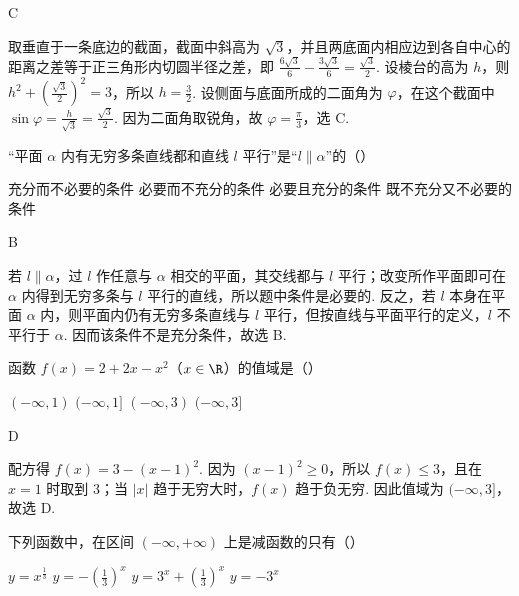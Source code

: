 \documentclass[UTF8,a4paper,oneside,11pt]{ctexbook}
\begin{document}
\begin{answer}
C
\end{answer}

\begin{solution}
取垂直于一条底边的截面，截面中斜高为 \(\sqrt3\)，并且两底面内相应边到各自中心的距离之差等于正三角形内切圆半径之差，即 \(\frac{6\sqrt3}{6}-\frac{3\sqrt3}{6}=\frac{\sqrt3}{2}\). 设棱台的高为 \(h\)，则 \(h^2+\left(\frac{\sqrt3}{2}\right)^2=3\)，所以 \(h=\frac32\). 设侧面与底面所成的二面角为 \(\varphi\)，在这个截面中 \(\sin\varphi=\frac{h}{\sqrt3}=\frac{\sqrt3}{2}\). 因为二面角取锐角，故 \(\varphi=\frac\pi3\)，选 C.
\end{solution}

\begin{problem}
“平面 \(\alpha\) 内有无穷多条直线都和直线 \(l\) 平行”是“\(l \parallel \alpha\)”的（\quad）

\choices
    {充分而不必要的条件}
    {必要而不充分的条件}
    {必要且充分的条件}
    {既不充分又不必要的条件}
\end{problem}

\begin{answer}
B
\end{answer}

\begin{solution}
若 \(l\parallel\alpha\)，过 \(l\) 作任意与 \(\alpha\) 相交的平面，其交线都与 \(l\) 平行；改变所作平面即可在 \(\alpha\) 内得到无穷多条与 \(l\) 平行的直线，所以题中条件是必要的. 反之，若 \(l\) 本身在平面 \(\alpha\) 内，则平面内仍有无穷多条直线与 \(l\) 平行，但按直线与平面平行的定义，\(l\) 不平行于 \(\alpha\). 因而该条件不是充分条件，故选 B.
\end{solution}

\begin{problem}
函数 \(f(x) = 2 + 2x - x^2\)（\(x \in \R\)）的值域是（\quad）

\choices
    {\((-\infty,1)\)}
    {\((-\infty,1]\)}
    {\((-\infty,3)\)}
    {\((-\infty,3]\)}
\end{problem}

\begin{answer}
D
\end{answer}

\begin{solution}
配方得 \(f(x)=3-(x-1)^2\). 因为 \((x-1)^2\geqslant0\)，所以 \(f(x)\leqslant3\)，且在 \(x=1\) 时取到 3；当 \(|x|\) 趋于无穷大时，\(f(x)\) 趋于负无穷. 因此值域为 \((-\infty,3]\)，故选 D.
\end{solution}

\begin{problem}
下列函数中，在区间 \((-\infty,+\infty)\) 上是减函数的只有（\quad）

\choices
    {\(y = x^{\frac{1}{3}}\)}
    {\(y = -\left(\frac{1}{3}\right)^x\)}
    {\(y = 3^x + \left(\frac{1}{3}\right)^x\)}
    {\(y = -3^x\)}
\end{problem}
\end{document}
